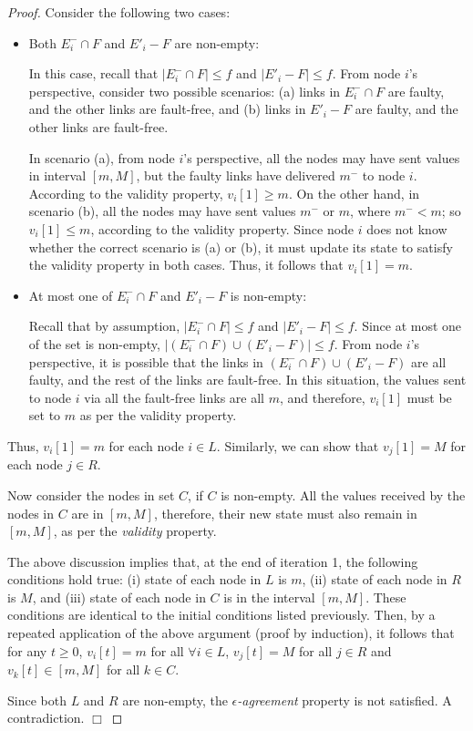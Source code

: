 \documentclass{llncs}
\newcommand{\fillbox}{\hspace*{\fill}\(\Box\)}
\begin{document}
\begin{proof}
Consider the following two cases:
\begin{itemize}

\item Both $E_i^-\cap F$ and $E'_i - F$ are non-empty:

In this case, recall that $|E_i^-\cap F|\leq f$ and $|E'_i - F|\leq f$.
From node $i$'s perspective, consider two possible scenarios:
(a) links in $E_i^-\cap F$ are faulty, and the other
links are fault-free, and (b) links in $E'_i - F$ are faulty, and the
other links are fault-free.

In scenario (a), from node $i$'s perspective, all the nodes may have sent values
in interval $[m,M]$, but the faulty links have delivered $m^-$ to node $i$. According to the validity
property, $v_i[1] \geq m$. On the other hand, in scenario (b), all the
nodes may have sent values $m^-$ or $m$, where $m^-<m$; so $v_i[1] \leq m$, according to
the validity property. Since node $i$ does not know whether the
correct scenario is (a) or (b), it must update its state to satisfy the
validity property in both cases. Thus, it follows that $v_i[1] = m$.

\item
At most one of $E_i^-\cap F$ and $E'_i - F$ is non-empty: 

Recall that by assumption, $|E_i^-\cap F|\leq f$ and $|E'_i - F|\leq f$. Since at most one of the set is non-empty, 
$|(E_i^-\cap F)\cup (E'_i-F)|\leq f $.
From node $i$'s perspective,
it is possible that the links in $(E_i^-\cap F)\cup (E'_i - F)$ are all faulty,
and the rest of the links are fault-free. 
In this situation, the values sent to node $i$ via all the fault-free links are all $m$, and therefore, $v_i[1]$ must be set to $m$
as per the validity property.

\end{itemize}
Thus, $v_i[1]=m$ for each node $i\in L$.
Similarly, we can show that $v_j[1] = M$ for each node $j \in R$.

Now consider the nodes in set $C$, if $C$ is non-empty.
All the values received by the nodes in $C$ are in $[m,M]$, therefore,
their new state must also remain in $[m,M]$, as per the {\em validity} property.

The above discussion implies that, at the end of iteration 1,
the following conditions hold true: (i) state of each node in $L$ is
$m$, (ii) state of each node in $R$ is $M$, and (iii) state of each node
in $C$ is in the interval $[m,M]$. These conditions are identical to the initial conditions
listed previously. Then, by a repeated application of the above
argument (proof by induction), it follows that for
any $t \geq 0$, $v_i[t] = m$ for all $\forall i \in L$, $v_j[t] = M$
for all $j \in R$ and $v_k[t]\in[m,M]$ for all $k\in C$.

Since both $L$ and $R$ are non-empty, the {\em $\epsilon$-agreement} property
is not satisfied. A contradiction.
\fillbox
\end{proof}
\end{document}
